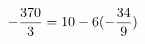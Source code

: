 \documentclass[preview]{standalone}
\begin{document}
\begin{align*}
\special{dvisvgm:raw <g id='unique000'>}- \frac{370}{3} = 10 - 6 (- \frac{34}{9})\special{dvisvgm:raw </g>}
\end{align*}
\end{document}

